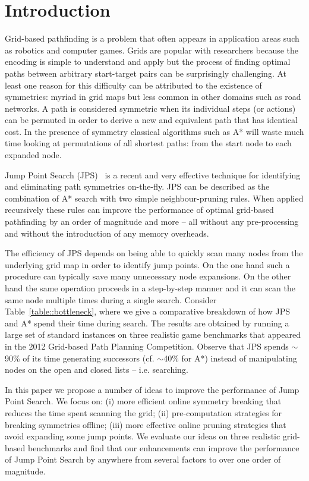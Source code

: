 \section{Introduction}
\label{sec::introduction}
Grid-based pathfinding is a problem that often
appears in application areas such as robotics and computer games. 
Grids are popular with researchers because the encoding is
simple to understand and apply but the process of finding optimal paths
between arbitrary start-target pairs can be surprisingly challenging. At least
one reason for this difficulty can be attributed to the existence of 
symmetries: myriad in grid maps but less common in other domains such as
road networks. A path is considered symmetric when its individual steps 
(or actions) can be permuted in order to derive a new and equivalent path
that has identical cost.
In the presence of symmetry classical algorithms such as A* will waste much 
time looking at permutations of all shortest paths: from the start node to each expanded node.

Jump Point Search (JPS)~\cite{harabor11b} is a recent and very effective 
technique for identifying and eliminating path symmetries on-the-fly. 
JPS can be described as the combination of A* search with two simple 
neighbour-pruning rules. When applied recursively these rules
can improve the performance of optimal grid-based pathfinding by an order of 
magnitude and more -- all without any pre-processing and without the 
introduction of any memory overheads.



The efficiency of JPS depends on being able to quickly scan many nodes
from the underlying grid map in order to identify jump points.
On the one hand such a procedure can typically save many unnecessary
node expansions. On the other hand the same operation proceeds in a 
step-by-step manner and it can scan the same node multiple times during 
a single search. 
Consider Table~\ref{table::bottleneck}, where we give a comparative
breakdown of how JPS and A{*} spend their time during search.
The results are obtained by running
a large set of standard instances on three realistic game benchmarks
that appeared in the 2012 Grid-based Path Planning Competition. Observe that
JPS spends $\sim$90\% of its time generating successors (cf. $\sim$40\% for
A{*}) instead of manipulating nodes on the open and closed lists -- i.e.
searching.

In this paper we propose a number of ideas to improve the performance of Jump
Point Search. We focus on: (i) more efficient online symmetry breaking that
reduces the time spent scanning the grid; (ii) pre-computation strategies for
breaking symmetries offline; (iii) more effective online pruning strategies
that avoid expanding some jump points. We evaluate our ideas on three realistic
grid-based benchmarks and find that our enhancements can improve the
performance of Jump Point Search by anywhere from several factors to over one
order of magnitude.

